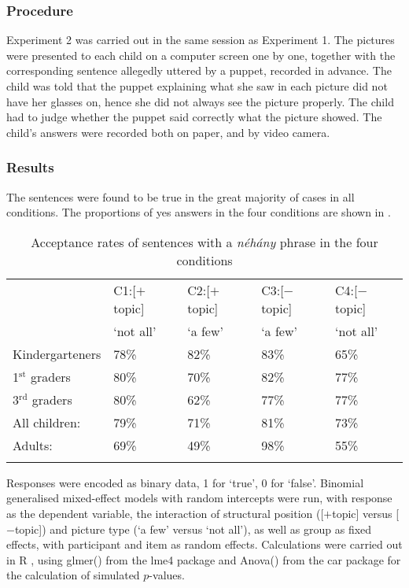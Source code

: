 \documentclass[output=paper]{langscibook}
\begin{document}
\subsubsection{Procedure}

Experiment 2 was carried out in the same session as Experiment 1. The pictures were presented to each child on a computer screen one by one, together with the corresponding sentence allegedly uttered by a puppet, recorded in advance. The child was told that the puppet explaining what she saw in each picture did not have her glasses on, hence she did not always see the picture properly. The child had to judge whether the puppet said correctly what the picture showed. The child’s answers were recorded both on paper, and by video camera.

\subsubsection{Results}

The sentences were found to be true in the great majority of cases in all conditions.  The proportions of yes answers in the four conditions are shown in .

\begin{table}
\centering
\begin{tabular}{l l l l l}
\lsptoprule
{} & C1:[$+$topic] & C2:[$+$topic] & C3:[$-$topic]  & C4:[$-$topic] \\
{} & `not all' & `a few' & `a few' & `not all' \\
\midrule
Kindergarteners & 78\% & 82\% & 83\% & 65\% \\
1$^\text{st}$ graders & 80\% & 70\% & 82\% & 77\% \\
3$^\text{rd}$ graders & 80\% & 62\% & 77\% & 77\% \\
\midrule
All children: & 79\% & 71\% & 81\% & 73\% \\
Adults:	 & 69\% & 49\% & 98\% & 55\% \\
\lspbottomrule
\end{tabular}
\caption{Acceptance rates of sentences with a \textit{néhány} phrase in the four conditions}
\label{kis-zet:table:2}
\end{table}

Responses were encoded as binary data, 1 for `true', 0 for `false'. Binomial generalised mixed-effect models with random intercepts were run, with response as the dependent variable, the interaction of structural position ([$+$topic] versus [$-$topic]) and picture type (`a few' versus `not all'), as well as group as fixed effects, with participant and item as random effects. Calculations were carried out in R \citep{rcore19}, using glmer() from the lme4 package \citep{bates2015fitting} and Anova() from the car package \citep{fox2018r} for the calculation of simulated $p$-values.
\end{document}
